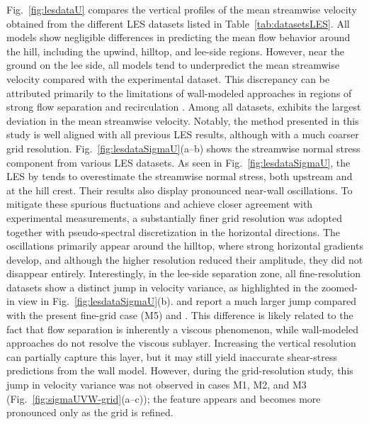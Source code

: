 \documentclass[%
superscriptaddress,
 amsmath,amssymb,
pra,
showkeys,
]{revtex4-2}
\begin{document}
Fig.~\ref{fig:lesdataU} compares the vertical profiles of the mean streamwise velocity obtained from the different LES datasets listed in Table~\ref{tab:datasetsLES}. All models show negligible differences in predicting the mean flow behavior around the hill, including the upwind, hilltop, and lee-side regions. However, near the ground on the lee side, all models tend to underpredict the mean streamwise velocity compared with the experimental dataset. This discrepancy can be attributed primarily to the limitations of wall-modeled approaches in regions of strong flow separation and recirculation \cite{liu2020wall,stevens2014large}. Among all datasets, \citet{diebold2013flow} exhibits the largest deviation in the mean streamwise velocity. Notably, the method presented in this study is well aligned with all previous LES results, although with a much coarser grid resolution. Fig.~\ref{fig:lesdataSigmaU}(a--b) shows the streamwise normal stress component from various LES datasets. As seen in Fig.~\ref{fig:lesdataSigmaU}, the LES by \citet{liu2020wall} tends to overestimate the streamwise normal stress, both upstream and at the hill crest. Their results also display pronounced near-wall oscillations. To mitigate these spurious fluctuations and achieve closer agreement with experimental measurements, a substantially finer grid resolution was adopted together with pseudo-spectral discretization in the horizontal directions. The oscillations primarily appear around the hilltop, where strong horizontal gradients develop, and although the higher resolution reduced their amplitude, they did not disappear entirely. Interestingly, in the lee-side separation zone, all fine-resolution datasets show a distinct jump in velocity variance, as highlighted in the zoomed-in view in Fig.~\ref{fig:lesdataSigmaU}(b). \citet{fang2016intercomparison} and \citet{diebold2013flow} report a much larger jump compared with the present fine-grid case (M5) and \citet{liu2020wall}. This difference is likely related to the fact that flow separation is inherently a viscous phenomenon, while wall-modeled approaches do not resolve the viscous sublayer. Increasing the vertical resolution can partially capture this layer, but it may still yield inaccurate shear-stress predictions from the wall model. However, during the grid-resolution study, this jump in velocity variance was not observed in cases M1, M2, and M3 (Fig.~\ref{fig:sigmaUVW-grid}(a--c)); the feature appears and becomes more pronounced only as the grid is refined.
%
\end{document}
